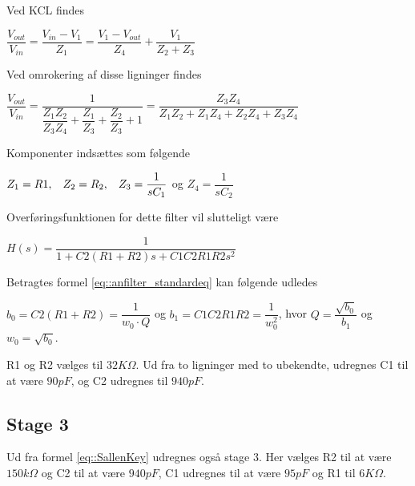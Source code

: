 Ved KCL findes\\
\begin{center}
	$\dfrac{V_{out}}{V_{in}} = \dfrac{V_{in}-V_1}{Z_1} = \dfrac{V_1 - V_{out}}{Z_4}+\dfrac{V_1}{Z_2+Z_3}$
\end{center}
Ved omrokering af disse ligninger findes

\begin{center}
	$\dfrac{V_{out}}{V_{in}} = \dfrac{1}{\dfrac{Z_1Z_2}{Z_3Z_4}+\dfrac{Z_1}{Z_3}+\dfrac{Z_2}{Z_3}+1} = \dfrac{Z_3Z_4}{Z_1Z_2+Z_1Z_4+Z_2Z_4+Z_3Z_4}$
\end{center}

Komponenter indsættes som følgende

\begin{center}
	$Z_1 = R1, \hspace{3mm} Z_2 = R_2, \hspace{3mm} Z_3 = \dfrac{1}{sC_1}$ \hspace{0.5mm} og \hspace{0.5mm} $Z_4 = \dfrac{1}{sC_2}$
\end{center}

Overføringsfunktionen for dette filter vil slutteligt være\\

\begin{center}
\begin{math}
H(s) = \dfrac{1}{1+C2(R1+R2) s+C1C2R1R2 s^2}
\label{eq::SallenKey}
\end{math}
	
\end{center} 

Betragtes formel \ref{eq::anfilter_standardeq} kan følgende udledes\\
\begin{center}
	 $b_0 = C2(R1+R2) = \dfrac{1}{w_0\cdot Q}$ og $b_1 = C1C2R1R2 = \dfrac{1}{w_0^2}$, hvor $Q = \dfrac{\sqrt{b_0}}{b_1}$ og $w_0 = \sqrt{b_0}$.
\end{center}
R1 og R2 vælges til $32K\Omega$. Ud fra to ligninger med to ubekendte, udregnes C1 til at være $90pF$, og C2 udregnes til $940pF$.\\
\subsection{Stage 3}
Ud fra formel \ref{eq::SallenKey} udregnes også stage 3. Her vælges R2 til at være $150k\Omega$ og C2 til at være $940pF$, C1 udregnes til at være $95pF$ og R1 til $6K\Omega$. 


